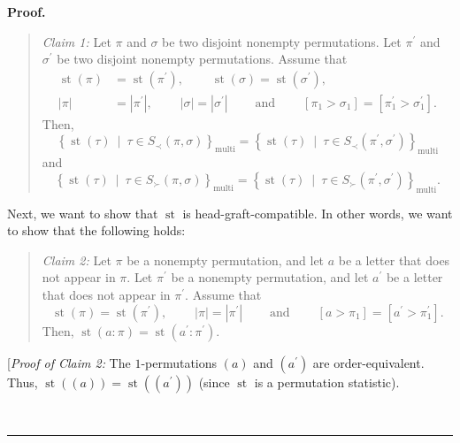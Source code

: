 \documentclass[numbers=enddot,12pt,final,onecolumn,notitlepage]{scrartcl}%
\theoremstyle{definition}
\newenvironment{statement}{\begin{quote}}{\end{quote}}
\newenvironment{proof}[1][Proof]{\noindent\textbf{#1.} }{\ \rule{0.5em}{0.5em}}
\newenvironment{verlong}{}{}
\begin{document}
\begin{verlong}
\begin{proof}
\begin{statement}
\textit{Claim 1:} Let $\pi$ and $\sigma$ be two disjoint nonempty
permutations. Let $\pi^{\prime}$ and $\sigma^{\prime}$ be two disjoint
nonempty permutations. Assume that%
\begin{align*}
\operatorname*{st}\left(  \pi\right)   &  =\operatorname*{st}\left(
\pi^{\prime}\right)  ,\ \ \ \ \ \ \ \ \ \ \operatorname*{st}\left(
\sigma\right)  =\operatorname*{st}\left(  \sigma^{\prime}\right)  ,\\
\left\vert \pi\right\vert  &  =\left\vert \pi^{\prime}\right\vert
,\ \ \ \ \ \ \ \ \ \ \left\vert \sigma\right\vert =\left\vert \sigma^{\prime
}\right\vert \ \ \ \ \ \ \ \ \ \ \text{and}\ \ \ \ \ \ \ \ \ \ \left[  \pi
_{1}>\sigma_{1}\right]  =\left[  \pi_{1}^{\prime}>\sigma_{1}^{\prime}\right]
.
\end{align*}
Then,
\[
\left\{  \operatorname*{st}\left(  \tau\right)  \ \mid\ \tau\in S_{\prec
}\left(  \pi,\sigma\right)  \right\}  _{\operatorname*{multi}}=\left\{
\operatorname*{st}\left(  \tau\right)  \ \mid\ \tau\in S_{\prec}\left(
\pi^{\prime},\sigma^{\prime}\right)  \right\}  _{\operatorname*{multi}}%
\]
and%
\[
\left\{  \operatorname*{st}\left(  \tau\right)  \ \mid\ \tau\in S_{\succ
}\left(  \pi,\sigma\right)  \right\}  _{\operatorname*{multi}}=\left\{
\operatorname*{st}\left(  \tau\right)  \ \mid\ \tau\in S_{\succ}\left(
\pi^{\prime},\sigma^{\prime}\right)  \right\}  _{\operatorname*{multi}}.
\]

\end{statement}

Next, we want to show that $\operatorname*{st}$ is head-graft-compatible. In
other words, we want to show that the following holds:

\begin{statement}
\textit{Claim 2:} Let $\pi$ be a nonempty permutation, and let $a$ be a letter
that does not appear in $\pi$. Let $\pi^{\prime}$ be a nonempty permutation,
and let $a^{\prime}$ be a letter that does not appear in $\pi^{\prime}$.
Assume that%
\[
\operatorname*{st}\left(  \pi\right)  =\operatorname*{st}\left(  \pi^{\prime
}\right)  ,\ \ \ \ \ \ \ \ \ \ \left\vert \pi\right\vert =\left\vert
\pi^{\prime}\right\vert \ \ \ \ \ \ \ \ \ \ \text{and}%
\ \ \ \ \ \ \ \ \ \ \left[  a>\pi_{1}\right]  =\left[  a^{\prime}>\pi
_{1}^{\prime}\right]  .
\]
Then, $\operatorname*{st}\left(  a:\pi\right)  =\operatorname*{st}\left(
a^{\prime}:\pi^{\prime}\right)  $.
\end{statement}

[\textit{Proof of Claim 2:} The $1$-permutations $\left(  a\right)  $ and
$\left(  a^{\prime}\right)  $ are order-equivalent. Thus, $\operatorname*{st}%
\left(  \left(  a\right)  \right)  =\operatorname*{st}\left(  \left(
a^{\prime}\right)  \right)  $ (since $\operatorname*{st}$ is a permutation statistic).


\end{proof}
\end{verlong}
\end{document}
